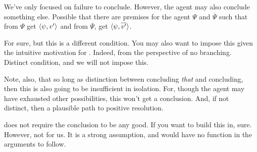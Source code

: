 \begin{note}
  We've only focused on failure to conclude.
  However, the agent may also conclude something else.
  Possible that there are premises for the agent \(\Psi\) and \(\overline{\Psi}\) such that from \(\Psi\) get \(\langle \psi, v' \rangle\) and from \(\overline{\Psi}\), get \(\langle \psi, \overline{v'} \rangle\).

  For sure, but this is a different condition.
  You may also want to impose this given the intuitive motivation for \csN{}.
  Indeed, from the perspective of no branching.
  Distinct condition, and we will not impose this.

  Note, also, that so long as distinction between concluding \emph{that} and concluding, then this is also going to be insufficient in isolation.
  For, though the agent may have exhausted other possibilities, this won't get a conclusion.
  And, if not distinct, then a plausible path to positive resolution.
\end{note}

\begin{note}
  \iCS{} does not require the conclusion to be any good.
  If you want to build this in, sure.
  However, not for us.
  It is a strong assumption, and would have no function in the arguments to follow.
\end{note}

